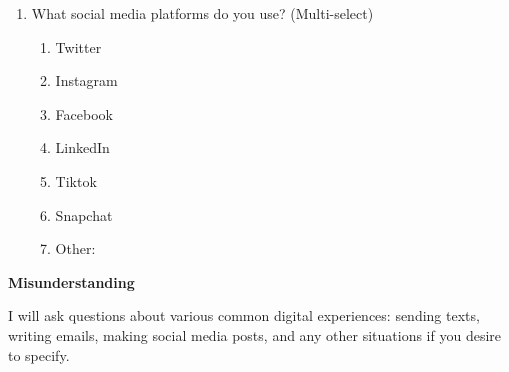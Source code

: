 \documentclass[acmsmall,screen,authorversion,nonacm]{acmart}
\begin{document}
\begin{enumerate}
\begin{enumerate}
        \end{enumerate}
        \item What social media platforms do you use? (Multi-select)
            \begin{enumerate}
                \item Twitter
                \item Instagram
                \item Facebook
                \item LinkedIn
                \item Tiktok
                \item Snapchat
                \item Other:
            \end{enumerate}
\end{enumerate}
\textbf{Misunderstanding}

 I will ask questions about various common digital experiences: sending texts, writing emails, making social media posts, and any other situations if you desire to specify.
\end{document}
